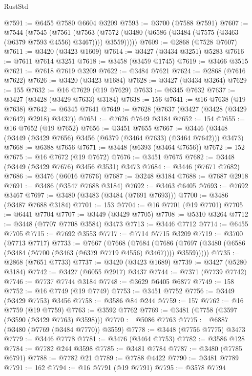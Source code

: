 \begin{lexlean}{RustStd}
\begin{coremodule}
{{{{{{{{{{{{{{{{{{{@7591 := @6455 @7580 @6604 @3209
@7593 := @3700 (@7588 @7591)
@7607 := @7544
    (@7545
      (@7561
        (@7563 (@7572 (@3480 (@6586 (@3484 (@7575 (@3463 (@6379 @7593 @4556) @3467)))) @3559)))))
@7609 := @2868 (@7528 @7607)
@7611 := @3420 (@3423 @1609)
@7614 := @3427 (@3434 @3251) @5283
@7616 := @7611 @7614 @3251
@7618 := @3458 (@3459 @1745)
@7619 := @3466 @3515
@7621 := @7618 @7619 @3209
@7622 := @3484 @7621
@7624 := @2868 (@7616 @7622)
@7626 := @3420 (@3423 @1684)
@7628 := @3427 (@3434 @3264)
@7629 := 155
@7632 := @16 @7629 (@19 @7629)
@7633 := @6345 @7632
@7637 := @3427 (@3428 (@3429 @7633) @3184)
@7638 := 156
@7641 := @16 @7638 (@19 @7638)
@7642 := @6345 @7641
@7649 := @7628 (@7637 (@3427 (@3428 (@3429 @7642) @2918) @3437))
@7651 := @7626 @7649 @3184
@7652 := 154
@7655 := @16 @7652 (@19 @7652)
@7656 := @3451 @7655
@7667 := @3446 (@3448 (@3449 (@3429 @7656) @3456 (@6379 (@3464 @7633) (@3464 @7642))) @3473)
@7668 := @6388 @7656
@7671 := @3448 (@6393 (@3464 @7656))
@7672 := 152
@7675 := @16 @7672 (@19 @7672)
@7676 := @3451 @7675
@7682 := @3448 (@3449 (@3429 @7676) @3456 @3531) @3473
@7684 := @3446 (@7671 @7682)
@7686 := @3476 (@6016 @7676)
@7687 := @3248 @3184
@7688 := @7687 @2918
@7691 := @3486 (@3547 @7688 @3184)
@7692 := @3463 @6405
@7693 := @7692 @3467
@7697 := @3480 (@3483 (@3484 (@7691 @7693)))
@7700 := @3486 (@3487 @7688 @3184)
@7701 := 153
@7704 := @16 @7701 (@19 @7701)
@7705 := @6441 @7704
@7707 := @3449 (@3429 @7705)
@7708 := @5310 @3264
@7712 := @3448 (@7707 @7708 @3584) @3473
@7713 := @3446 @7712
@7714 := @6455 @7705
@7715 := @7692 @3553
@7717 := @7714 @7715 @3209
@7719 := @3700 (@7713 @7717)
@7733 := @7667
    (@7668
      (@7684
        (@7686 (@7697 (@3480 (@6586 (@3484 (@7700 (@3463 (@6379 @7719 @4556) @3467)))) @3559)))))
@7735 := @2868 (@7651 @7733)
@7737 := @3420 (@3423 @1689)
@7739 := @3427 (@5280 @3184)
@7742 := @3427 (@6055 @2917) @3437
@7744 := @7371 (@7739 @7742)
@7746 := @7737 @7744 @3184
@7748 := @3629 @6405 @6877
@7749 := 158
@7752 := @16 @7749 (@19 @7749)
@7753 := @3451 @7752
@7756 := @3449 (@3429 @7753) @3456
@7758 := @3586 @84 @244
@7759 := 157
@7762 := @16 @7759 (@19 @7759)
@7763 := @3592 @7762
@7769 := @3481 (@7758 (@3597 (@3590 (@3429 @7763) @3598)))
@7770 := @5086 @7763
@7775 := @6887 (@3480 (@7769 (@3484 @7770)) @3559)
@7778 := @3448 (@7756 @7775) @3473
@7779 := @3446 @7778
@7781 := @3476 (@3464 @7753)
@7782 := @3586 @128
@7784 := @7782 @244 @3598
@7785 := @3481 @7784
@7787 := @3480 (@7785 @6791)
@7788 := @7782 @21
@7789 := @7788 @4422
@7790 := @3481 @7789
@7791 := 162
@7794 := @16 @7791 (@19 @7791)
@7795 := @3578 @7794
}}}}}}}}}}}}}}}}}}}
\end{coremodule}
\end{lexlean}
